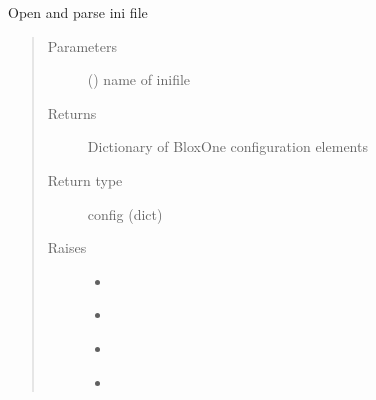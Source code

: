 \documentclass[letterpaper,10pt,english]{sphinxmanual}
\begin{document}

\begin{fulllineitems}
\label{\detokenize{code:bloxone.bloxone.read_b1_ini}}
\sphinxAtStartPar
Open and parse ini file
\begin{quote}\begin{description}
\item[{Parameters}] \leavevmode
\sphinxAtStartPar
{} () \textendash{} name of inifile

\item[{Returns}] \leavevmode
\sphinxAtStartPar
Dictionary of BloxOne configuration elements

\item[{Return type}] \leavevmode
\sphinxAtStartPar
config (dict)

\item[{Raises}] \leavevmode\begin{itemize}
\item {} 
\sphinxAtStartPar
{\hyperref[\detokenize{code:bloxone.bloxone.IniFileSectionError}]{}} \textendash{} 

\item {} 
\sphinxAtStartPar
{\hyperref[\detokenize{code:bloxone.bloxone.IniFileKeyError}]{}} \textendash{} 

\item {} 
\sphinxAtStartPar
{\hyperref[\detokenize{code:bloxone.bloxone.APIKeyFormatError}]{}} \textendash{} 

\item {} 
\sphinxAtStartPar
{} \textendash{} 

\end{itemize}

\end{description}\end{quote}

\end{fulllineitems}
\end{document}

